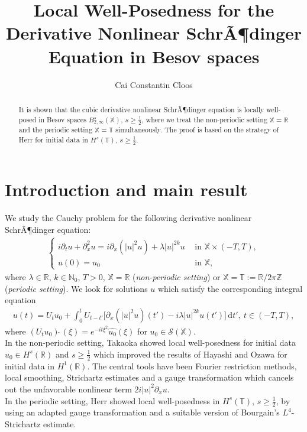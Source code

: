 \documentclass[reqno]{amsart}
\title{Local Well-Posedness for the Derivative Nonlinear SchrÃ¶dinger Equation in Besov spaces}
\author{Cai Constantin Cloos}
\theoremstyle{Definitionl}
\theoremstyle{Definitionk}
\theoremstyle{definition}
\theoremstyle{Satzk}
\theoremstyle{Satzl}
\theoremstyle{Bemerkung}
\begin{document}
\setcounter{page}{1}
\begin{abstract}
It is shown that the cubic derivative nonlinear SchrÃ¶\-din\-ger equation is locally well-posed in Besov spaces $B^{s}_{2,\infty}(\mathbb X)$, $s\ge\tfrac12$, where we treat the non-periodic setting $\mathbb X=\mathbb R$ and the periodic setting $\mathbb X=\mathbb T$ simultaneously. The proof is based on the strategy of Herr for initial data in $H^{s}(\mathbb T)$, $s\ge\tfrac12$. 
\end{abstract}
\maketitle
\section{Introduction and main result}
We study the Cauchy problem for the following derivative nonlinear SchrÃ¶dinger equation:
\begin{align}
\begin{cases}
i\partial_tu+\partial_x^2u= i\partial_x(|u|^2u)+\lambda |u|^{2k}u\ &\,\text{in }\mathbb X \times(-T,T),\\
u(0)= u_0\ &\,\text{in }\mathbb X,
\end{cases}\label{G2}\end{align}
where $\lambda\in\mathbb R$, $k\in\mathbb N_0$, $T>0$, $\mathbb X=\mathbb R$ (\emph{non-periodic setting}) or $\mathbb X=\mathbb T:=\mathbb R/2\pi\mathbb Z$ (\emph{periodic setting}).
We look for solutions $u$ which satisfy the corresponding integral equation
\begin{align*}
u(t)= U_tu_0+\int_0^tU_{t-t'}\big[\partial_x(|u|^2u)(t')-i\lambda|u|^{2k}u(t')\big]\,\mathrm dt',\ t\in(-T,T),
\end{align*}
where $(U_tu_0)\widehat\ (\xi)= e^{-it\xi^2}\widehat{u_0}(\xi)
$ for $u_0\in\mathcal S(\mathbb X)$.\\[10pt]
In the non-periodic setting, Takaoka \cite{Ta2} showed local well-posedness for initial data $u_0\in H^s(\mathbb R)$ and $s\ge\tfrac12$ which improved the results of Hayashi and Ozawa \cite{HaOz2,Hay,HaOz} for initial data in $H^1(\mathbb R)$. The central tools have been Fourier restriction methods, local smoothing, Strichartz estimates and a gauge transformation which cancels out the unfavorable nonlinear term $2i|u|^2\partial_xu$.\\[10pt]
In the periodic setting, Herr \cite{Herr} showed local well-posedness in $H^s(\mathbb T)$, $s\ge\tfrac12$, by using an adapted gauge transformation and a suitable version of Bourgain's $L^4$-Strichartz estimate.\\[10pt]
\end{document}
